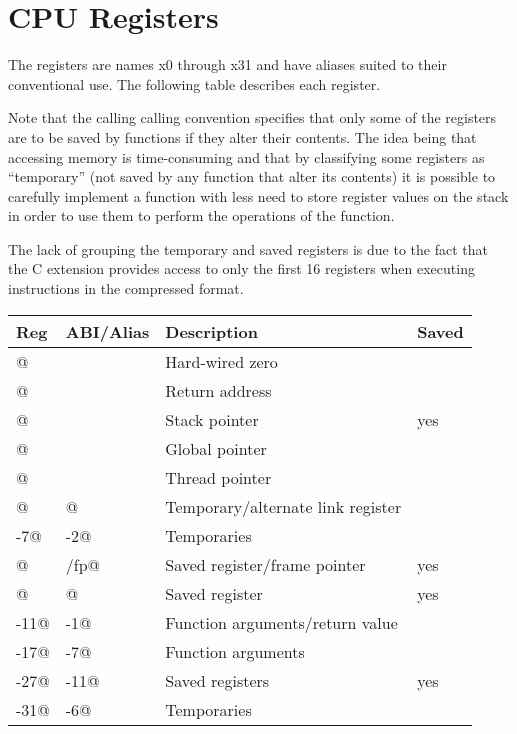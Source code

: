 

\section{CPU Registers}
\label{cpuregs}

The registers are names x0 through x31 and have aliases suited to their 
conventional use.  The following table describes each register.  

Note 
that the calling calling convention specifies that only some 
of the registers are to be saved by functions if they alter their contents.
The idea being that accessing memory is time-consuming and that by
classifying some registers as ``temporary'' (not saved by any function
that alter its contents) it is possible to carefully implement a function
with less need to store register values on the stack in order to use them
to perform the operations of the function.

The lack of grouping the temporary and saved registers is due to the
fact that the C extension %
provides access to only the first 16 registers when executing instructions 
in the compressed format.  


\begin{center}
\begin{tabular}{|l|l|l|l|}
\hline
Reg		& ABI/Alias	& Description						& Saved		\\
\hline
\hline
\verb@x0@		&	\verb@zero@		& Hard-wired zero					&			\\
\verb@x1@		&	\verb@ra@		& Return address					& 			\\
\verb@x2@		&	\verb@sp@		& Stack pointer						& yes		\\
\verb@x3@		&	\verb@gp@		& Global pointer					&			\\
\verb@x4@		&	\verb@tp@		& Thread pointer					&			\\
\verb@x5@		&	\verb@t0@		& Temporary/alternate link register	&			\\
\verb@x6-7@		&	\verb@t1-2@		& Temporaries						&			\\
\verb@x8@		&	\verb@s0/fp@	& Saved register/frame pointer		& yes		\\
\verb@x9@		&	\verb@s1@		& Saved register					& yes		\\
\verb@x10-11@	&	\verb@a0-1@		& Function arguments/return value	& 			\\
\verb@x12-17@	&	\verb@a2-7@		& Function arguments				& 			\\
\verb@x18-27@	&	\verb@s2-11@	& Saved registers					& yes		\\
\verb@x28-31@	&	\verb@t3-6@		& Temporaries						&			\\
\hline
\end{tabular}
\end{center}



